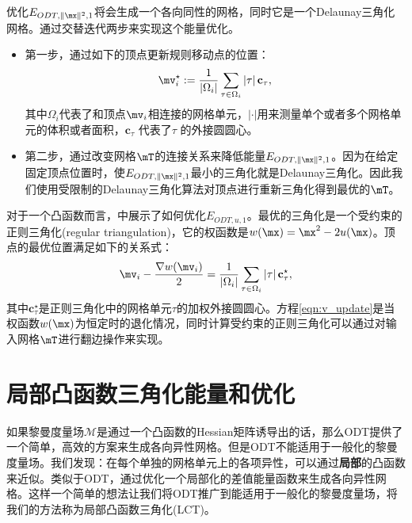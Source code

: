 优化$E_{ODT,\|\mx\|^2, 1}$将会生成一个各向同性的网格，同时它是一个Delaunay三角化网格。\cite{Alliez2005}通过交替迭代两步来实现这个能量优化。
\begin{itemize}
\item 第一步，通过如下的顶点更新规则移动点的位置：
\begin{equation}\label{eqn:v_update}
	\mv_i^\star :=  \frac{1}{|\Omega_i|} \sum_{\tau \in \Omega_i}  |\tau| \, \mathbf{c}_\tau ,
\end{equation}
其中$\Omega_i$代表了和顶点$\mv_i$相连接的网格单元，$|\cdot|$用来测量单个或者多个网格单元的体积或者面积，$\mathbf{c}_\tau$ 代表了$\tau$ 的外接圆圆心。
\item 第二步，通过改变网格$\mT$的连接关系来降低能量$E_{ODT,\|\mx\|^2, 1}$。因为在给定固定顶点位置时，使$E_{ODT,\|\mx\|^2, 1}$最小的三角化就是Delaunay三角化\cite{Chen2004}。因此我们使用受限制的Delaunay三角化算法对顶点进行重新三角化得到最优的$\mT$。
\end{itemize}

对于一个凸函数而言，\cite{Chen2004a,Liu2013,Desbrun2013}中展示了如何优化$E_{ODT,u,1}$。最优的三角化是一个受约束的正则三角化(regular triangulation)，它的权函数是$w(\mx) = \mx^2 - 2u(\mx)$。顶点的最优位置满足如下的关系式：
\begin{equation}
\mv_i - \frac{\nabla w(\mv_i)}{2} = \frac{1}{|\Omega_i|} \sum_{\tau \in \Omega_i}  |\tau| \, \mathbf{c}^\star_\tau,
\end{equation}
其中$\mathbf{c}^\star_\tau$是正则三角化中的网格单元$\tau$的加权外接圆圆心。方程\ref{eqn:v_update}是当权函数$w(\mx)$为恒定时的退化情况，同时计算受约束的正则三角化可以通过对输入网格$\mT$进行翻边操作来实现\cite{Liu2013}。

\section{局部凸函数三角化能量和优化} \label{sec:LCT}
如果黎曼度量场$\mathcal{M}$是通过一个凸函数的Hessian矩阵诱导出的话，那么ODT提供了一个简单，高效的方案来生成各向异性网格。但是ODT不能适用于一般化的黎曼度量场。我们发现：在每个单独的网格单元上的各项异性，可以通过\textbf{局部}的凸函数来近似。类似于ODT，通过优化一个局部化的差值能量函数来生成各向异性网格。这样一个简单的想法让我们将ODT推广到能适用于一般化的黎曼度量场，将我们的方法称为局部凸函数三角化(LCT)。

